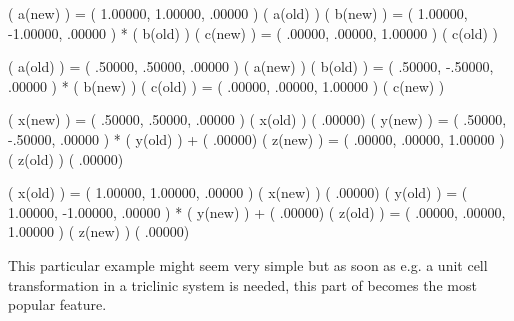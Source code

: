 \begin{MacVerbatim}
     ( a(new) ) = (   1.00000,  1.00000,   .00000 )   ( a(old) )
     ( b(new) ) = (   1.00000, -1.00000,   .00000 ) * ( b(old) )
     ( c(new) ) = (    .00000,   .00000,  1.00000 )   ( c(old) )

     ( a(old) ) = (    .50000,   .50000,   .00000 )   ( a(new) )
     ( b(old) ) = (    .50000,  -.50000,   .00000 ) * ( b(new) )
     ( c(old) ) = (    .00000,   .00000,  1.00000 )   ( c(new) )

     ( x(new) ) = (    .50000,   .50000,   .00000 )   ( x(old) )   (   .00000)
     ( y(new) ) = (    .50000,  -.50000,   .00000 ) * ( y(old) ) + (   .00000)
     ( z(new) ) = (    .00000,   .00000,  1.00000 )   ( z(old) )   (   .00000)

     ( x(old) ) = (   1.00000,  1.00000,   .00000 )   ( x(new) )   (   .00000)
     ( y(old) ) = (   1.00000, -1.00000,   .00000 ) * ( y(new) ) + (   .00000)
     ( z(old) ) = (    .00000,   .00000,  1.00000 )   ( z(new) )   (   .00000)
\end{MacVerbatim}
%
This particular example might seem very simple but as soon as e.g.
a unit cell transformation in a triclinic system is needed, this
part of \Discus becomes the most popular feature.

